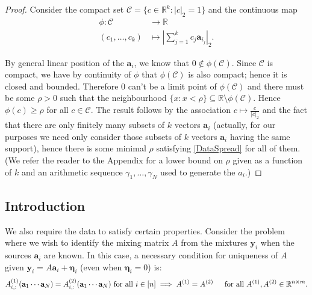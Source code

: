 \documentclass[journal, onecolumn]{IEEEtran}
\begin{document}
\begin{proof}
Consider the compact set $\mathcal{C} = \{c \in \mathbb{R}^k: |c|_2 = 1\}$ and the continuous map
\begin{align*}
\phi: \mathcal{C} &\to \mathbb{R} \\
(c_1, \ldots, c_k) &\mapsto |\sum_{j = 1}^k c_j \mathbf{a}_{i_j}|_2.
\end{align*}

By general linear position of the $\mathbf{a}_i$, we know that $0 \notin \phi(\mathcal{C})$. Since $\mathcal{C}$ is compact, we have by continuity of $\phi$ that $\phi(\mathcal{C})$ is also compact; hence it is closed and bounded. Therefore $0$ can't be a limit point of $\phi(\mathcal{C})$ and there must be some $\rho > 0$ such that the neighbourhood $\{x: x < \rho\} \subseteq \mathbb{R} \setminus \phi(\mathcal{C})$. Hence $\phi(c) \geq \rho$ for all $c \in \mathcal{C}$. The result follows by the association $c \mapsto \frac{c}{|c|_2}$ and the fact that there are only finitely many subsets of $k$ vectors $\mathbf{a}_i$ (actually, for our purposes we need only consider those subsets of $k$ vectors $\mathbf{a}_i$ having the same support), hence there is some minimal $\rho$ satisfying \eqref{DataSpread} for all of them. (We refer the reader to the Appendix for a lower bound on $\rho$ given as a function of $k$ and an arithmetic sequence $\gamma_1, \ldots, \gamma_N$ used to generate the $a_i$.)
\end{proof}


      
\subsection{Introduction}

We also require the data to satisfy certain properties. Consider the problem where we wish to identify the mixing matrix $A$ from the mixtures $\mathbf{y}_i$ when the sources $\mathbf{a}_i$ are known. In this case, a necessary condition for uniqueness of $A$ given $\mathbf{y}_i = A \mathbf{a}_i + \mathbf{\eta}_i$ (even when $\mathbf{\eta}_i=0$) is:
\begin{align}\label{SparkCondition2}
A^{(1)}_{i,:}(\mathbf{a}_1 \cdots \mathbf{a}_N) = A^{(2)}_{i,:}(\mathbf{a}_1 \cdots \mathbf{a}_N)  \text{ for all } i \in [n] \implies A^{(1)}  = A^{(2)} \indent \text{for all } A^{(1)}, A^{(2)} \in \mathbb{R}^{n \times m}.
\end{align}
\end{document}

